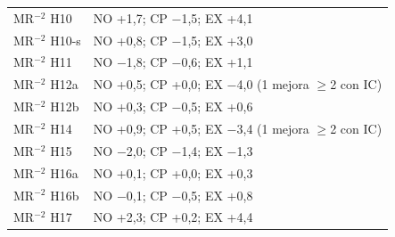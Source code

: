 \begin{table}[H]
\begin{tabular}{@{}l l r l@{}}
MR$^{-2}$ H10 & \multicolumn{3}{l}{NO +1{,}7; CP $-$1{,}5; EX +4{,}1} \\
MR$^{-2}$ H10-s & \multicolumn{3}{l}{NO +0{,}8; CP $-$1{,}5; EX +3{,}0} \\
MR$^{-2}$ H11 & \multicolumn{3}{l}{NO $-$1{,}8; CP $-$0{,}6; EX +1{,}1} \\
MR$^{-2}$ H12a & \multicolumn{3}{l}{NO +0{,}5; CP +0{,}0; EX $-$4{,}0 (1 mejora $\geq$2 con IC)} \\
MR$^{-2}$ H12b & \multicolumn{3}{l}{NO +0{,}3; CP $-$0{,}5; EX +0{,}6} \\
MR$^{-2}$ H14 & \multicolumn{3}{l}{NO +0{,}9; CP +0{,}5; EX $-$3{,}4 (1 mejora $\geq$2 con IC)} \\
MR$^{-2}$ H15 & \multicolumn{3}{l}{NO $-$2{,}0; CP $-$1{,}4; EX $-$1{,}3} \\
MR$^{-2}$ H16a & \multicolumn{3}{l}{NO +0{,}1; CP +0{,}0; EX +0{,}3} \\
MR$^{-2}$ H16b & \multicolumn{3}{l}{NO $-$0{,}1; CP $-$0{,}5; EX +0{,}8} \\
MR$^{-2}$ H17 & \multicolumn{3}{l}{NO +2{,}3; CP +0{,}2; EX +4{,}4} \\
\bottomrule\end{tabular}\end{table}
